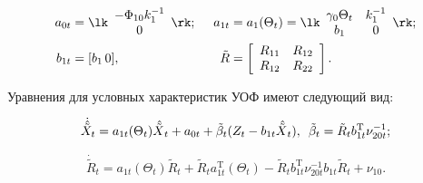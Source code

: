 \noindent

 \begin{alignat*}{2}

 a_{0t} &= \lk \begin{array}{c}

    -\Phi_{10} k_1^{-1}\\

    0

    \end{array}\rk;&\enskip

    a_{1t} &= a_1 (\Theta_t) = \lk \begin{array}{cc}

    \gamma_0 \Theta_t&k_1^{-1}\\

    b_1&0

    \end{array}\rk;

   \\

    b_{1t} &= [b_1\, 0],&\enskip \tilde R &= \left[\begin{array}{cc}

    R_{11}& R_{12}\\

    R_{12}& R_{22}

    \end{array}\right]. %

    \end{alignat*}



Уравнения для условных характеристик УОФ имеют следующий вид:

   \begin{equation}

   \dot{\hat{\tilde X}}_t = a_{1t} (\Theta_t){\hat{\tilde X}}_t + a_{0t} 

+\tilde \beta_t (Z_t - b_{1t} {\hat{\tilde X}}_t),\enskip

       \tilde \beta_t =\tilde R_t b_{1t}^{\mathrm{T}} \nu_{20t}^{-1}; 

       \label{e5.22-sin}

       \end{equation}

          \begin{equation}

{\dot{\tilde R}}_t = a_{1t}(\Theta_t) \tilde R_t + \tilde R_t 

a_{1t}^{\mathrm{T}}(\Theta_t)-\tilde R_t b_{1t}^{\mathrm{T}} \nu_{20t}^{-1} b_{1t} \tilde R_t 

+\nu_{10}.

\label{e5.23-sin}

\end{equation}


